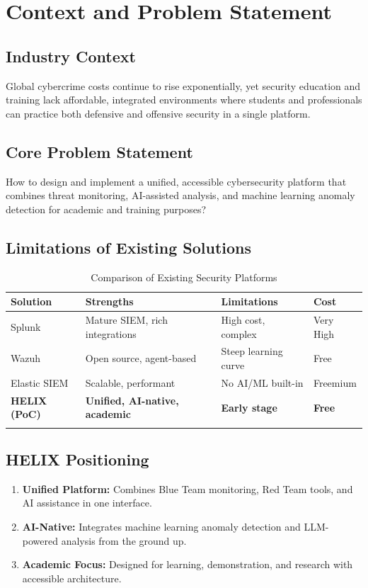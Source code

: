 \documentclass[12pt,a4paper]{report}
\begin{document}
	\chapter{Context and Problem Statement}
	
	\section{Industry Context}
	Global cybercrime costs continue to rise exponentially, yet security education and training lack affordable, integrated environments where students and professionals can practice both defensive and offensive security in a single platform.
	
	\section{Core Problem Statement}
	\begin{warningbox}[title=Central Problem]
		How to design and implement a unified, accessible cybersecurity platform that combines threat monitoring, AI-assisted analysis, and machine learning anomaly detection for academic and training purposes?
	\end{warningbox}
	
	\section{Limitations of Existing Solutions}
	\begin{longtable}{L{3.0cm} L{4.0cm} L{3.5cm} C{2.0cm}}
		\toprule
		\textbf{Solution} & \textbf{Strengths} & \textbf{Limitations} & \textbf{Cost} \\
		\midrule
		Splunk & Mature SIEM, rich integrations & High cost, complex & Very High \\
		Wazuh & Open source, agent-based & Steep learning curve & Free \\
		Elastic SIEM & Scalable, performant & No AI/ML built-in & Freemium \\
		\textbf{HELIX (PoC)} & \textbf{Unified, AI-native, academic} & \textbf{Early stage} & \textbf{Free} \\
		\bottomrule
		\caption{Comparison of Existing Security Platforms}
	\end{longtable}
	
	\section{HELIX Positioning}
	\begin{enumerate}
		\item \textbf{Unified Platform:} Combines Blue Team monitoring, Red Team tools, and AI assistance in one interface.
		\item \textbf{AI-Native:} Integrates machine learning anomaly detection and LLM-powered analysis from the ground up.
		\item \textbf{Academic Focus:} Designed for learning, demonstration, and research with accessible architecture.
	\end{enumerate}
	
\end{document}
